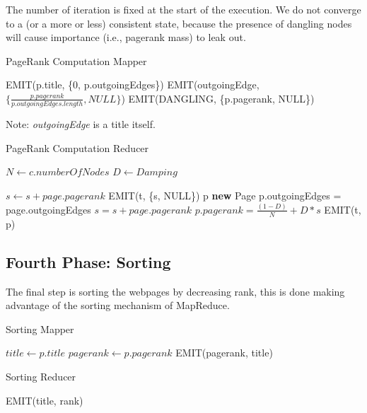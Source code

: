 The number of iteration is fixed at the start of the execution. We do not converge to a (or a more or less) consistent state, because the presence of dangling nodes will cause importance (i.e., pagerank mass) to leak out.

\begin{algorithm}
	\caption{PageRank Computation Mapper}\label{Mapper}
		\begin{algorithmic}[1]
			
				\State EMIT(p.title, \{0, p.outgoingEdges\})
						\State EMIT(outgoingEdge, $\{\frac{p.pagerank}{p.outgoingEdges.length}, NULL\}$)
					\EndFor
				\Else
					\State EMIT(DANGLING, \{p.pagerank, NULL\})
				\EndIf
			\EndProcedure
	\end{algorithmic}
\end{algorithm}
Note: \textit{outgoingEdge} is a title itself.


\begin{algorithm}[H]
	\caption{PageRank Computation Reducer}\label{Reducer}
		\begin{algorithmic}[1]
				\State $N \gets c.numberOfNodes$
				\State $D \gets Damping$
			\EndProcedure
		
						\State $s \gets s + page.pagerank$	
					\EndFor
					\State EMIT(t, \{s, NULL\})
				\Else
					\State p \textbf{new} Page
							\State p.outgoingEdges = page.outgoingEdges
						\Else
							\State $s = s + page.pagerank$
						\EndIf
					\EndFor
					\State$p.pagerank =  \frac{(1-D)}{N} + D*s$
					\State EMIT(t, p)
				\EndIf
			\EndProcedure
	\end{algorithmic}
\end{algorithm}



\subsection{Fourth Phase: Sorting}
The final step is sorting the webpages by decreasing rank, this is done making advantage of the sorting mechanism of MapReduce.

\begin{algorithm}[H]
	\caption{Sorting Mapper}\label{Mapper}
		\begin{algorithmic}[1]
					\State $title \gets p.title$
					\State $pagerank \gets p.pagerank$
					\State EMIT(pagerank, title)
			\EndProcedure
	\end{algorithmic}
\end{algorithm}

\begin{algorithm}[H]
	\caption{Sorting Reducer}\label{Reducer}
		\begin{algorithmic}[1]
						\State EMIT(title, rank)
					\EndFor
			\EndProcedure
	\end{algorithmic}
\end{algorithm}
